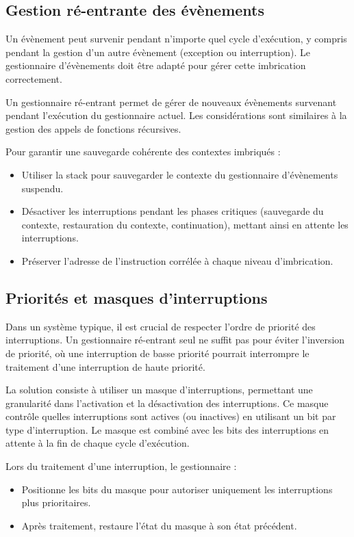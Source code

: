 \subsection{Gestion ré-entrante des évènements}

Un évènement peut survenir pendant n'importe quel cycle d'exécution, y compris pendant la gestion d'un autre évènement (exception ou interruption). 
Le gestionnaire d'évènements doit être adapté pour gérer cette imbrication correctement.

Un gestionnaire ré-entrant permet de gérer de nouveaux évènements survenant pendant l'exécution du gestionnaire actuel. 
Les considérations sont similaires à la gestion des appels de fonctions récursives. 

Pour garantir une sauvegarde cohérente des contextes imbriqués :
\begin{itemize}
    \item Utiliser la stack pour sauvegarder le contexte du gestionnaire d'évènements suspendu.
    \item Désactiver les interruptions pendant les phases critiques (sauvegarde du contexte, restauration du contexte, continuation), mettant ainsi en attente les interruptions.
    \item Préserver l'adresse de l'instruction corrélée à chaque niveau d'imbrication.
\end{itemize}

\subsection{Priorités et masques d'interruptions}

Dans un système typique, il est crucial de respecter l'ordre de priorité des interruptions. 
Un gestionnaire ré-entrant seul ne suffit pas pour éviter l'inversion de priorité, où une interruption de basse priorité pourrait interrompre le traitement d'une interruption de haute priorité.

La solution consiste à utiliser un masque d'interruptions, permettant une granularité dans l'activation et la désactivation des interruptions. 
Ce masque contrôle quelles interruptions sont actives (ou inactives) en utilisant un bit par type d'interruption. 
Le masque est combiné avec les bits des interruptions en attente à la fin de chaque cycle d'exécution.

Lors du traitement d'une interruption, le gestionnaire :
\begin{itemize}
    \item Positionne les bits du masque pour autoriser uniquement les interruptions plus prioritaires.
    \item Après traitement, restaure l'état du masque à son état précédent.
\end{itemize}


